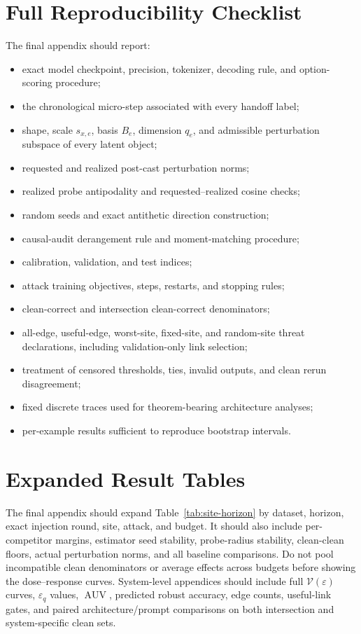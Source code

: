 \documentclass[11pt]{article}
\DeclareMathOperator{\AUV}{AUV}
\newcommand{\eps}{\varepsilon}
\newcommand{\Vuln}{\mathcal V}
\begin{document}
\section{Full Reproducibility Checklist}

The final appendix should report:
\begin{itemize}
    \item exact model checkpoint, precision, tokenizer, decoding rule, and
    option-scoring procedure;
    \item the chronological micro-step associated with every handoff label;
    \item shape, scale \(s_{x,e}\), basis \(B_e\), dimension \(q_e\), and
    admissible perturbation subspace of every latent object;
    \item requested and realized post-cast perturbation norms;
    \item realized probe antipodality and requested--realized cosine checks;
    \item random seeds and exact antithetic direction construction;
    \item causal-audit derangement rule and moment-matching procedure;
    \item calibration, validation, and test indices;
    \item attack training objectives, steps, restarts, and stopping rules;
    \item clean-correct and intersection clean-correct denominators;
    \item all-edge, useful-edge, worst-site, fixed-site, and random-site threat
    declarations, including validation-only link selection;
    \item treatment of censored thresholds, ties, invalid outputs, and clean
    rerun disagreement;
    \item fixed discrete traces used for theorem-bearing architecture analyses;
    \item per-example results sufficient to reproduce bootstrap intervals.
\end{itemize}

\section{Expanded Result Tables}

The final appendix should expand Table~\ref{tab:site-horizon} by dataset,
horizon, exact injection round, site, attack, and budget. It should also include
per-competitor margins, estimator seed stability, probe-radius stability,
clean-clean floors, actual perturbation norms, and all baseline comparisons.
Do not pool incompatible clean denominators or average effects across budgets
before showing the dose--response curves. System-level appendices should include
full \(\Vuln(\eps)\) curves, \(\eps_q\) values, \(\AUV\), predicted robust
accuracy, edge counts, useful-link gates, and paired architecture/prompt
comparisons on both intersection and system-specific clean sets.
\end{document}
